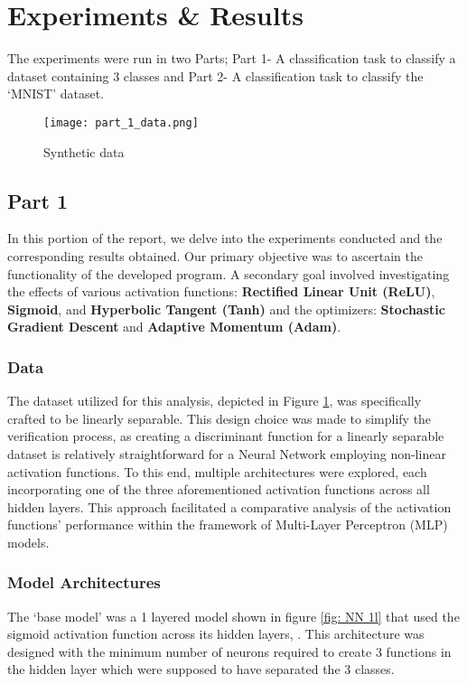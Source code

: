 \section{Experiments \& Results}

The experiments were run in two Parts; Part 1- A classification task to classify a dataset containing 3 classes and 
Part 2- A classification task to classify the `MNIST' dataset.

\begin{figure}
    \centering
    \texttt{[image: part\_1\_data.png]}
    \caption[short]{Synthetic data}
    \label{fig: Synthetic data}
\end{figure}

\subsection{Part 1}

In this portion of the report, we delve into the experiments conducted and the
corresponding results obtained. Our primary objective was to ascertain the 
functionality of the developed program. A secondary goal involved investigating 
the effects of various activation functions: \textbf{Rectified Linear Unit (ReLU)}, 
\textbf{Sigmoid}, and \textbf{Hyperbolic Tangent (Tanh)} and the optimizers: 
\textbf{Stochastic Gradient Descent} and \textbf{Adaptive Momentum (Adam)}. 

\subsubsection{Data}
The dataset utilized for 
this analysis, depicted in Figure \ref{fig: Synthetic data}, was specifically 
crafted to be linearly separable. This design choice was made to simplify the 
verification process, as creating a discriminant function for a linearly 
separable dataset is relatively straightforward for a Neural Network employing 
non-linear activation functions. To this end, multiple architectures were 
explored, each incorporating one of the three aforementioned activation 
functions across all hidden layers. This approach facilitated a comparative 
analysis of the activation functions' performance within the framework of 
Multi-Layer Perceptron (MLP) models. 

\subsubsection{Model Architectures}
The `base model' was a 1 layered model shown in figure \ref{fig: NN 1l} that 
used the sigmoid activation function across its hidden layers, . This architecture was 
designed with the minimum number of neurons required to create 3 functions in the
hidden layer which were supposed to have separated the 3 classes.

